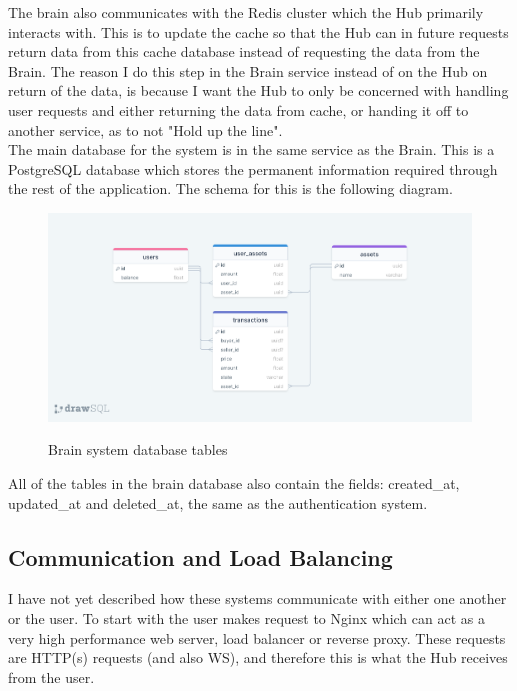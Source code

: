 \documentclass[titlepage]{article}
\begin{document}
The brain also communicates with the Redis cluster which the Hub primarily interacts with. This is to update the cache so that the Hub can in future requests return data from this cache database instead of requesting the data from the Brain. The reason I do this step in the Brain service instead of on the Hub on return of the data, is because I want the Hub to only be concerned with handling user requests and either returning the data from cache, or handing it off to another service, as to not "Hold up the line". \\

The main database for the system is in the same service as the Brain. This is a PostgreSQL database which stores the permanent information required through the rest of the application. The schema for this is the following diagram. \\


\begin{figure}
\includegraphics[width=\textwidth]{brain_diagram.png}
  \label{brain_tables}
  \caption{Brain system database tables}
\centering
\end{figure}

All of the tables in the brain database also contain the fields: created\_at, updated\_at and deleted\_at, the same as the authentication system.

\subsection{Communication and Load Balancing}
I have not yet described how these systems communicate with either one another or the user. To start with the user makes request to Nginx which can act as a very high performance web server, load balancer or reverse proxy. These requests are HTTP(s) requests (and also WS), and therefore this is what the Hub receives from the user. \\
\end{document}
